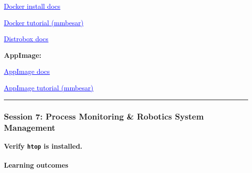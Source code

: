\documentclass[
  english,
  paper=a4,
  oneside  ,captions=tableheading
]{scrartcl}
\renewenvironment{quote}{\begin{customblockquote}\list{}{\rightmargin=0em\leftmargin=0em}%
\item\relax\color{blockquote-text}\ignorespaces}{\unskip\unskip\endlist\end{customblockquote}}
\begin{document}
%
  \par\vspace{0.5ex}%
  \href{https://docs.docker.com/engine/install/ubuntu/}{\textcolor{blue}{\underline{\faLink\quad Docker install docs}}}%
  \par\vspace{0.5ex}%

%
  \par\vspace{0.5ex}%
  \href{https://mmbesar.github.io/Tutorials/HS-Docker/}{\textcolor{blue}{\underline{\faLink\quad Docker tutorial (mmbesar)}}}%
  \par\vspace{0.5ex}%

%
  \par\vspace{0.5ex}%
  \href{https://distrobox.it/}{\textcolor{blue}{\underline{\faLink\quad Distrobox docs}}}%
  \par\vspace{0.5ex}%

\textbf{AppImage:}

%
  \par\vspace{0.5ex}%
  \href{https://docs.appimage.org/}{\textcolor{blue}{\underline{\faLink\quad AppImage docs}}}%
  \par\vspace{0.5ex}%

%
  \par\vspace{0.5ex}%
  \href{https://mmbesar.github.io/Tutorials/appimages/}{\textcolor{blue}{\underline{\faLink\quad AppImage tutorial (mmbesar)}}}%
  \par\vspace{0.5ex}%

\begin{center}\rule{0.5\linewidth}{0.5pt}\end{center}

\subsubsection{Session 7: Process Monitoring \& Robotics System
Management}\label{session-7-process-monitoring-robotics-system-management}

\begin{quote}
\textbf{Verify \texttt{htop} is installed.}
\end{quote}

\paragraph{Learning outcomes}\label{learning-outcomes-6}
\end{document}
